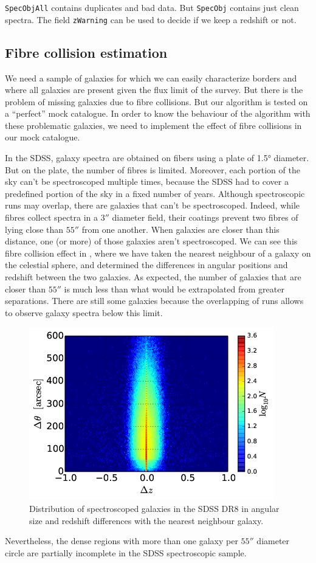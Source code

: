 \texttt{SpecObjAll} contains duplicates and bad data. But \texttt{SpecObj}
contains just clean spectra. The field \texttt{zWarning} can be used to decide
if we keep a redshift or not.

\subsection{Fibre collision estimation}

We need a sample of galaxies for which we can easily characterize borders and
where all galaxies are present given the flux limit of the survey. But there is
the problem of missing galaxies due to fibre collisions. But our algorithm is
tested on a ``perfect'' mock catalogue. In order to know the behaviour of the
algorithm with these problematic galaxies, we need to implement the effect of
fibre collisions in our mock catalogue.

In the SDSS, galaxy spectra are obtained on fibers using a plate of 1.5°
diameter. But on the plate, the number of fibres is limited. Moreover, each
portion of the sky can't be spectroscoped multiple times, because the SDSS
had to cover a predefined portion of the sky in a fixed number of years.
Although spectroscopic runs may overlap, there are galaxies that can't be
spectroscoped. Indeed, while fibres collect spectra in a $3''$ diameter field,
their coatings prevent two fibres of lying close than $55''$ from one another.
When galaxies are closer than this distance, one (or more) of those galaxies
aren't spectroscoped. We can see this fibre collision effect in
, where we have taken the nearest neighbour of a galaxy on
the celestial sphere, and determined the differences in angular positions and
redshift between the two galaxies. As expected, the number of galaxies that are
closer than $55''$ is much less than what would be extrapolated from greater
separations. There are still some galaxies because the overlapping of runs
allows to observe galaxy spectra below this limit.

\begin{figure}[ht] \centering
    \includegraphics[width=0.6\linewidth]{figures/sdss/plane.png}
    \caption{\footnotesize{}Distribution of spectroscoped galaxies in the SDSS
    DR8 in angular size and redshift differences with the nearest neighbour
galaxy.\label{fig:plane}} \end{figure}
%
Nevertheless, the dense regions with more than one galaxy per $55''$ diameter
circle are partially incomplete in the SDSS spectroscopic sample.

